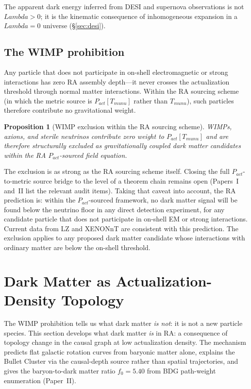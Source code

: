 \documentclass[11pt]{article}
\def\Lambda{Lambda}%
\def\mu{mu}%
\def\nu{nu}%
\def\mathrm#1{#1}%
\newtheorem{proposition}{Proposition}
\begin{document}
The apparent dark energy inferred from DESI and supernova observations is not $\Lambda > 0$; it is the kinematic consequence of inhomogeneous expansion in a $\Lambda = 0$ universe (\S\ref{sec:desi}).

\subsection{The WIMP prohibition}

Any particle that does not participate in on-shell electromagnetic or strong interactions has zero RA assembly depth---it never crosses the actualization threshold through normal matter interactions. Within the RA sourcing scheme (in which the metric source is $P_{\mathrm{act}}[T_{\mu\nu}]$ rather than $T_{\mu\nu}$), such particles therefore contribute no gravitational weight.

\begin{proposition}[WIMP exclusion within the RA sourcing scheme]
WIMPs, axions, and sterile neutrinos contribute zero weight to $P_{\mathrm{act}}[T_{\mu\nu}]$ and are therefore structurally excluded as gravitationally coupled dark matter candidates \emph{within} the RA $P_{\mathrm{act}}$-sourced field equation.
\end{proposition}

The exclusion is as strong as the RA sourcing scheme itself. Closing the full $P_{\mathrm{act}}$-to-metric source bridge to the level of a theorem chain remains open (Papers~I and~II list the relevant audit items). Taking that caveat into account, the RA prediction is: within the $P_{\mathrm{act}}$-sourced framework, no dark matter signal will be found below the neutrino floor in any direct detection experiment, for any candidate particle that does not participate in on-shell EM or strong interactions. Current data from LZ and XENONnT are consistent with this prediction. The exclusion applies to any proposed dark matter candidate whose interactions with ordinary matter are below the on-shell threshold.

\section{Dark Matter as Actualization-Density Topology}
\label{sec:darkmatter}

The WIMP prohibition tells us what dark matter \emph{is not}: it is not a new particle species. This section develops what dark matter \emph{is} in RA: a consequence of topology change in the causal graph at low actualization density. The mechanism predicts flat galactic rotation curves from baryonic matter alone, explains the Bullet Cluster via the causal-depth source rather than spatial trajectories, and gives the baryon-to-dark matter ratio $f_0 = 5.40$ from BDG path-weight enumeration (Paper~II).
\end{document}
